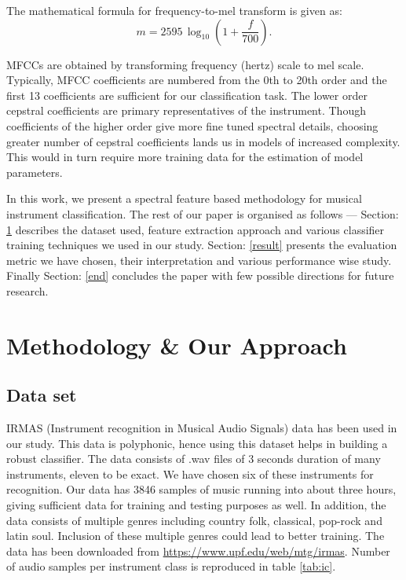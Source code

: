 \documentclass[conference]{IEEEtran}
\begin{document}
The mathematical formula for frequency-to-mel transform is given as: $$m = 2595\,\log_{10}\left(1+\frac f{700}\right).$$


MFCCs are obtained by transforming frequency (hertz) scale to mel scale. Typically, MFCC coefficients are numbered from the $0$th to 20th order and the first 13 coefficients are sufficient for our classification task. The lower order cepstral coefficients are primary representatives of the instrument. Though coefficients of the higher order give more fine tuned spectral details, choosing greater number of cepstral coefficients lands us in models of increased complexity. This would in turn require more training data for the estimation of model parameters.

In this work, we present a spectral feature based methodology for musical instrument classification. The rest of our paper is organised as follows --- Section: \ref{method} describes the dataset used, feature extraction approach and various classifier training techniques we used in our study. Section: \ref{result} presents the evaluation metric we have chosen, their interpretation and various performance wise study.  Finally Section: \ref{end} concludes the paper with few possible directions for future research.

\section{Methodology \& Our Approach}

\label{method}
\subsection{Data set}
IRMAS (Instrument recognition in Musical Audio Signals)\cite{bosch2012comparison} data has been used in our study. This data is polyphonic, hence using this dataset helps in building a robust classifier. The data consists of .wav files of 3 seconds duration of many instruments, eleven to be exact. We have chosen six of these instruments for recognition. Our data has 3846 samples of music running into about three hours, giving sufficient data for training and testing purposes as well. In addition, the data consists of multiple genres including country folk, classical, pop-rock and latin soul. Inclusion of these multiple genres could lead to better training. The data has been downloaded from \url{https://www.upf.edu/web/mtg/irmas}. Number of audio samples per instrument class is reproduced in table \ref{tab:ic}.
\end{document}
